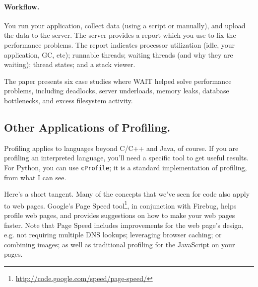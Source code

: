 \paragraph{Workflow.} You run your application, collect data (using a
script or manually), and upload the data to the server. The server provides
a report which you use to fix the performance problems.
The report indicates processor utilization (idle, your application, GC, 
etc); runnable threads; waiting threads (and why they are waiting); 
thread states; and a stack viewer.

The paper presents six case studies where WAIT helped solve performance
problems, including deadlocks, server underloads, memory leaks, database
bottlenecks, and excess filesystem activity.

\subsection*{Other Applications of Profiling.} 
Profiling applies to languages beyond C/C++ and Java, of course. If you are
profiling an interpreted language, you'll need a specific tool to get useful
results. For Python, you can use {\tt cProfile}; it is a standard implementation
of profiling, from what I can see.


Here's a short tangent. Many of the concepts that we've seen for code
also apply to web pages. Google's Page Speed
tool\footnote{\url{http://code.google.com/speed/page-speed/}}, in
conjunction with Firebug, helps profile web pages, and provides
suggestions on how to make your web pages faster. Note that Page Speed
includes improvements for the web page's design, e.g. not requiring
multiple DNS lookups; leveraging browser caching; or combining images;
as well as traditional profiling for the JavaScript on your pages.





